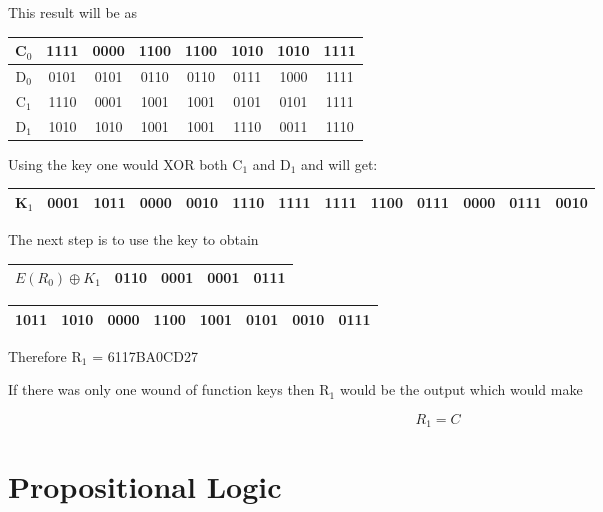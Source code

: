 \documentclass[11pt,a4paper]{report}
\begin{document}
This result will be as

\begin{center}
\begin{tabular}{|c|c|c|c|c|c|c|c|} \hline
C$_{0}$ & 1111 & 0000 & 1100 & 1100 & 1010 & 1010 & 1111\\ \hline
D$_{0}$ & 0101 & 0101 & 0110 & 0110 & 0111 & 1000 & 1111\\ \hline
C$_{1}$ & 1110 & 0001 & 1001 & 1001 & 0101 & 0101 & 1111\\ \hline
D$_{1}$ & 1010 & 1010 & 1001 & 1001 & 1110 & 0011 & 1110\\ \hline
\end{tabular}
\end{center}

Using the key one would XOR both C$_{1}$ and D$_{1}$ and will get:

\begin{center}
\begin{tabular}{|c|c|c|c|c|c|c|c|c|c|c|c|c|}\hline
K$_{1}$ & 0001 & 1011 & 0000 & 0010 & 1110 & 1111 & 1111 & 1100 & 0111 & 0000 & 0111 & 0010\\ \hline
\end{tabular}
\end{center}

The next step is to use the key to obtain

\begin{tabular}{|c|c|c|c|c|}\hline
$E(R_{0}) \oplus K_{1}$ & 0110 & 0001 & 0001 & 0111\\ \hline
\end{tabular}

\indent \begin{tabular}{|c|c||c|c|c|c|c|c|}\hline
1011 & 1010 & 0000 & 1100 & 1001 & 0101 & 0010 & 0111\\ \hline
\end{tabular}

Therefore R$_{1}$ = 6117BA0CD27

If there was only one wound of function keys then R$_{1}$ would be the output which would make

\begin{displaymath}
R_{1} = C
\end{displaymath}



\chapter{Propositional Logic}
\label{cha:prelim}
\end{document}
